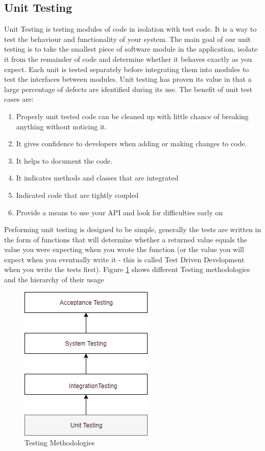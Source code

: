 \documentclass[article,type=msc,colorback,accentcolor=tud9c,twoside,11pt]{tudthesis}
\begin{document}
	\subsection{Unit Testing}
	Unit Testing\cite{EffectivnessofUnitTest} is testing modules of code in isolation with test code. It is a way to test the behaviour and functionality of your system. The main goal of our unit testing is to take the smallest piece of software module in the application, isolate it from the remainder of code and determine whether it behaves exactly as you expect. Each unit is tested separately before integrating them into modules to test the interfaces between modules. Unit testing has proven its value in that a large percentage of defects are identified during its use. The benefit of unit test cases are:
	\begin{enumerate}
		\item Properly unit tested code can be cleaned up with little chance of breaking anything without noticing it.
		\item It gives confidence to developers when adding or making changes to code.
		\item It helps to document the code.
		\item It indicates methods and classes that are integrated 
		\item Indicated code that are tightly coupled
		\item Provide a means to use your API and look for difficulties early on 
	\end{enumerate}
	Performing unit testing is designed to be simple, generally the tests are written in the form of functions that will determine whether a returned value equals the value you were expecting when you wrote the function (or the value you will expect when you eventually write it - this is called Test Driven Development when you write the tests first). Figure \ref{fig:Testingmethodologies} shows different Testing methodologies and the hierarchy of their usage
	\begin{figure}[h]
		\centering
		\includegraphics[scale=0.7]{Testing.jpg}
		\caption{Testing Methodologies}
		\label{fig:Testingmethodologies}
	\end{figure}
\end{document}
